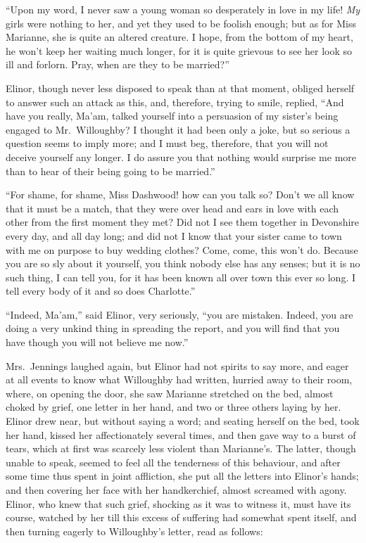``Upon my word, I never saw a young woman so
desperately in love in my life!  \emph{My} girls were nothing
to her, and yet they used to be foolish enough; but as
for Miss Marianne, she is quite an altered creature.
I hope, from the bottom of my heart, he won't keep her
waiting much longer, for it is quite grievous to see her
look so ill and forlorn.  Pray, when are they to be married?''

Elinor, though never less disposed to speak than at
that moment, obliged herself to answer such an attack
as this, and, therefore, trying to smile, replied, ``And have
you really, Ma'am, talked yourself into a persuasion
of my sister's being engaged to Mr.\ Willoughby?  I thought
it had been only a joke, but so serious a question seems
to imply more; and I must beg, therefore, that you will not
deceive yourself any longer.  I do assure you that nothing
would surprise me more than to hear of their being going
to be married.''

``For shame, for shame, Miss Dashwood! how can you
talk so?  Don't we all know that it must be a match, that
they were over head and ears in love with each other from
the first moment they met?  Did not I see them together
in Devonshire every day, and all day long; and did not I
know that your sister came to town with me on purpose
to buy wedding clothes?  Come, come, this won't do.
Because you are so sly about it yourself, you think nobody
else has any senses; but it is no such thing, I can tell you,
for it has been known all over town this ever so long.
I tell every body of it and so does Charlotte.''

``Indeed, Ma'am,'' said Elinor, very seriously,
``you are mistaken.  Indeed, you are doing a very unkind thing
in spreading the report, and you will find that you have
though you will not believe me now.''

Mrs.\ Jennings laughed again, but Elinor had not
spirits to say more, and eager at all events to know
what Willoughby had written, hurried away to their room,
where, on opening the door, she saw Marianne stretched on
the bed, almost choked by grief, one letter in her hand,
and two or three others laying by her.  Elinor drew near,
but without saying a word; and seating herself on the bed,
took her hand, kissed her affectionately several times,
and then gave way to a burst of tears, which at first
was scarcely less violent than Marianne's. The latter,
though unable to speak, seemed to feel all the tenderness
of this behaviour, and after some time thus spent in
joint affliction, she put all the letters into Elinor's hands;
and then covering her face with her handkerchief,
almost screamed with agony.  Elinor, who knew that such grief,
shocking as it was to witness it, must have its course,
watched by her till this excess of suffering had somewhat
spent itself, and then turning eagerly to Willoughby's letter,
read as follows:

